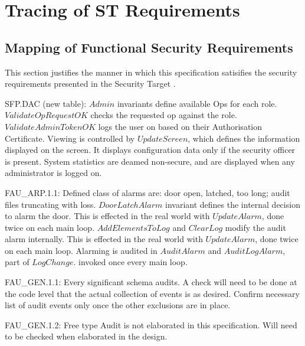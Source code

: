 \chapter{Tracing of ST Requirements}
\label{sec:STTrace}
\section{Mapping of Functional Security Requirements}
\label{sec:mapST}
This section justifies the manner in which this specification
satisifies the security requirements presented in the Security Target
\cite{ST}. 


{\footnotesize \sf 
SFP.DAC (new table):
} 
\newline
	$Admin$ invariants define available Ops for each
role. $ValidateOpRequestOK$ checks the requested op against the
role. $ValidateAdminTokenOK$ logs the user on based on their
Authorisation Certificate. 
Viewing is controlled by $UpdateScreen$, which defines the information
displayed on the screen. It displays configuration data only if the
security officer is present. System statistics are deamed non-secure,
and are displayed when any administrator is logged on.

{\footnotesize \sf 
FAU\_ARP.1.1:
} 
\newline
	Defined class of alarms are: door
	open, latched, too long; audit files truncating with loss. 
\newline
	$DoorLatchAlarm$ invariant defines the internal decision to
	alarm the door. This is effected in the real world with
	$UpdateAlarm$, done twice on each main loop. 
\newline
	$AddElementsToLog$ and $ClearLog$ modify the audit alarm
	internally.  This is effected in the real world with
	$UpdateAlarm$, done twice on each main loop. 
\newline
	Alarming is audited in $AuditAlarm$ and $AuditLogAlarm$, part of
	$LogChange$. invoked once every main loop. 

{\footnotesize \sf 
FAU\_GEN.1.1:
}
\newline
	Every significant schema audits. A check will need to be done
	at the code level that the actual collection of events is as
	desired. 
	Confirm necessary list of audit events only once the other
	exclusions are in place. 

{\footnotesize \sf 
FAU\_GEN.1.2:
}
\newline
	Free type Audit is not elaborated in this specification. Will
	need to be checked when elaborated in the design. 

